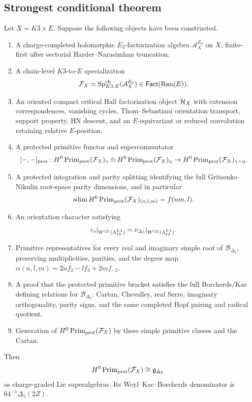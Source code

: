 \subsection{Strongest conditional theorem}

\begin{theorem}
\label{thm:conditional-primitive-comparison-gdelta5}
Let \(X=K3\times E\).  Suppose the following objects have been constructed.
\begin{enumerate}
\item A charge-completed holomorphic \(E_3\)-factorization algebra
\(\mathcal A_X^{E_3}\) on \(X\), finite-first after sectorial
Harder--Narasimhan truncation.
\item A chain-level \(K3\)-to-\(E\) specialization
\[
\mathcal F_X\simeq
\mathrm{Sp}^{\mathrm{ch}}_{K3,E}(\mathcal A_X^{E_3})
\in\mathsf{Fact}(\operatorname{Ran}(E)).
\]
\item An oriented compact critical Hall factorization object
\(\mathcal H_X\) with extension correspondences, vanishing cycles,
Thom--Sebastiani orientation transport, support property, HN descent, and
an \(E\)-equivariant or reduced convolution retaining relative
\(E\)-position.
\item A protected primitive functor and supercommutator
\[
[-,-]_{\mathrm{prot}}:
H^0\operatorname{Prim}_{\mathrm{prot}}(\mathcal F_X)_\gamma
\otimes
H^0\operatorname{Prim}_{\mathrm{prot}}(\mathcal F_X)_\eta
\to
H^0\operatorname{Prim}_{\mathrm{prot}}(\mathcal F_X)_{\gamma+\eta}.
\]
\item A protected integration and parity splitting identifying the full
Gritsenko--Nikulin root-space parity dimensions, and in particular
\[
\operatorname{sdim} H^0\operatorname{Prim}_{\mathrm{prot}}(\mathcal F_X)_{(n,l,m)}
=f(nm,l).
\]
\item An orientation character satisfying
\[
\epsilon_o|_{W^{(2)}(\Lambda^{2,1}_{II})}
=
\nu_{\Delta_5}|_{W^{(2)}(\Lambda^{2,1}_{II})}.
\]
\item Primitive representatives for every real and imaginary simple root
of \(\mathscr B_{\Delta_5}\), preserving multiplicities, parities, and
the degree map \(\alpha(n,l,m)=2nf_2-lf_3+2mf_{-2}\).
\item A proof that the protected primitive bracket satisfies the full
Borcherds/Kac defining relations for \(\mathscr B_{\Delta_5}\): Cartan,
Chevalley, real Serre, imaginary orthogonality, parity signs, and the
same completed Hopf pairing and radical quotient.
\item Generation of
\(H^0\operatorname{Prim}_{\mathrm{prot}}(\mathcal F_X)\) by these simple primitive
classes and the Cartan.
\end{enumerate}
Then
\[
H^0\operatorname{Prim}_{\mathrm{prot}}(\mathcal F_X)
\cong
\mathfrak g_{\Delta_5}
\]
as charge-graded Lie superalgebras.  Its Weyl--Kac--Borcherds
denominator is \(64^{-1}\Delta_5(2Z)\).
\end{theorem}

